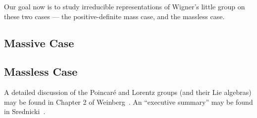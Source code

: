 Our goal now is to study irreducible representations of Wigner's little
group on these two cases --- the positive-definite mass case, and the
massless case.

\subsection*{Massive Case}
\subsection*{Massless Case}

A detailed discussion of the Poincar\'e and Lorentz groups (and their
Lie algebras) may be found in Chapter 2 of
Weinberg~\cite{Weinberg:1995mt}.
An ``executive summary'' may be found in Srednicki~\cite{Srednicki:2007qs}.

